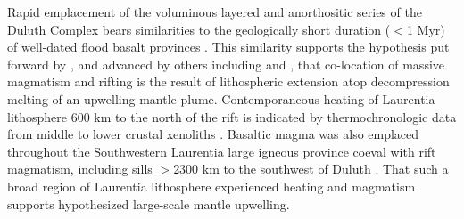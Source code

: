 \documentclass[11pt,letterpaper]{article}
\begin{document}
Rapid emplacement of the voluminous layered and anorthositic series of the Duluth Complex bears similarities to the geologically short duration ($<$1 Myr) of well-dated flood basalt provinces \citep{Burgess2015a, Schoene2019a}. This similarity supports the hypothesis put forward by \cite{Green1983a}, and advanced by others including \cite{Cannon1992a} and \cite{Stein2015a}, that co-location of massive magmatism and rifting is the result of lithospheric extension atop decompression melting of an upwelling mantle plume. Contemporaneous heating of Laurentia lithosphere 600 km to the north of the rift is indicated by thermochronologic data from middle to lower crustal xenoliths \citep{Edwards2018a}. Basaltic magma was also emplaced throughout the Southwestern Laurentia large igneous province coeval with rift magmatism, including sills $>$2300 km to the southwest of Duluth \citep{Bright2014a}. That such a broad region of Laurentia lithosphere experienced heating and magmatism supports hypothesized large-scale mantle upwelling.

\end{document}
